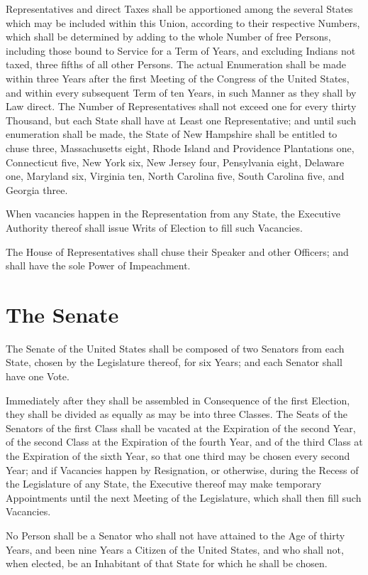 \documentclass{constitution}
\begin{document}
Representatives and direct Taxes shall be apportioned
among the several States which may be included within this Union,
according to their respective Numbers,
which shall be determined by adding to the whole Number of free Persons,
including those bound to Service for a Term of Years,
and excluding Indians not taxed,
three fifths of all other Persons.
The actual Enumeration shall be made within three Years
after the first Meeting of the Congress of the United States,
and within every subsequent Term of ten Years,
in such Manner as they shall by Law direct.
The Number of Representatives shall not exceed one for every thirty Thousand,
but each State shall have at Least one Representative;
and until such enumeration shall be made,
the State of New Hampshire shall be entitled to chuse three,
	Massachusetts eight,
	Rhode Island and Providence Plantations one,
	Connecticut five,
	New York six,
	New Jersey four,
	Pensylvania eight,
	Delaware one,
	Maryland six,
	Virginia ten,
	North Carolina five,
	South Carolina five,
and	Georgia three.

When vacancies happen in the Representation from any State,
the Executive Authority thereof shall issue Writs of Election to fill such Vacancies.

The House of Representatives shall chuse their Speaker and other Officers;
and shall have the sole Power of Impeachment.

\section{The Senate}
The Senate of the United States shall be composed of two Senators from each State,
chosen by the Legislature thereof, for six Years;
and each Senator shall have one Vote.

Immediately after they shall be assembled in Consequence of the first Election,
they shall be divided as equally as may be into three Classes.
The Seats of the Senators of the first Class shall be vacated at the Expiration of the second Year,
of the second Class at the Expiration of the fourth Year,
and of the third Class at the Expiration of the sixth Year,
so that one third may be chosen every second Year;
and if Vacancies happen by Resignation, or otherwise,
during the Recess of the Legislature of any State,
the Executive thereof may make temporary Appointments
until the next Meeting of the Legislature,
which shall then fill such Vacancies.

No Person shall be a Senator who shall not have attained to the Age of thirty Years,
and been nine Years a Citizen of the United States,
and who shall not, when elected, be an Inhabitant of that State for which he shall be chosen.
\end{document}
